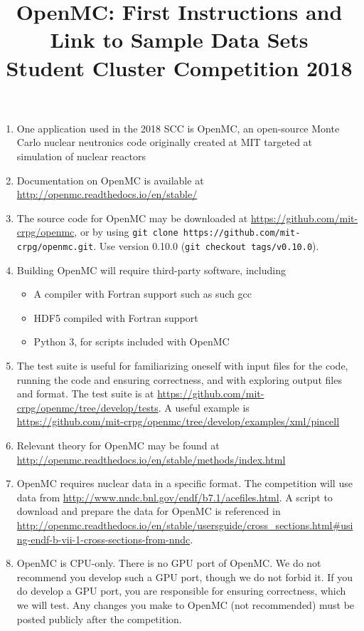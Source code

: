 \documentclass[10pt]{article}
\begin{document}
\title{OpenMC: First Instructions and Link to Sample Data Sets \\Student Cluster Competition 2018}

\maketitle

\begin{enumerate}
\item One application used in the 2018 SCC is OpenMC, an open-source Monte Carlo nuclear neutronics code originally created at MIT targeted at simulation of nuclear reactors
\item Documentation on OpenMC is available at \url{http://openmc.readthedocs.io/en/stable/}
\item The source code for OpenMC may be downloaded at \url{https://github.com/mit-crpg/openmc}, or by using \linebreak\verb+git clone https://github.com/mit-crpg/openmc.git+. Use  version 0.10.0 (\verb+git checkout tags/v0.10.0+).
\item Building OpenMC will require third-party software, including
    \begin{itemize}
    \item A compiler with Fortran support such as such gcc
     \item HDF5 compiled with Fortran support
     \item Python 3, for scripts included with OpenMC
    \end{itemize}
\item The test suite is useful for familiarizing oneself with input files for the code, running the code and ensuring correctness, and with exploring output files and format. The test suite is at \url{https://github.com/mit-crpg/openmc/tree/develop/tests}. {\color{red} A useful example is}  \url{https://github.com/mit-crpg/openmc/tree/develop/examples/xml/pincell}
\item Relevant theory for OpenMC may be found at \url{http://openmc.readthedocs.io/en/stable/methods/index.html}
\item OpenMC requires nuclear data in a specific format. The competition will use data from \url{http://www.nndc.bnl.gov/endf/b7.1/acefiles.html}. A script to download and prepare the data for OpenMC is referenced in {\footnotesize\url{http://openmc.readthedocs.io/en/stable/usersguide/cross_sections.html#using-endf-b-vii-1-cross-sections-from-nndc}}.
\item OpenMC is CPU-only. There is no GPU port of OpenMC. We do not recommend you develop such a GPU port, though we do not forbid it. If you do develop a GPU port, you are responsible for ensuring correctness, which we will test. Any changes you make to OpenMC (not recommended) must be posted publicly after the competition.
\end{enumerate}
\end{document}
